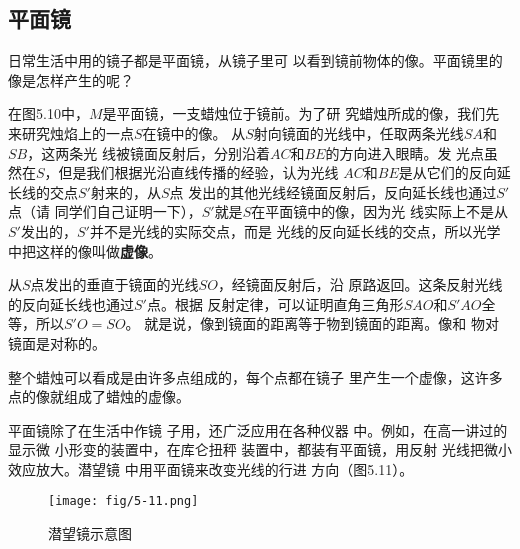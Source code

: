     \subsection{平面镜}

    日常生活中用的镜子都是平面镜，从镜子里可
    以看到镜前物体的像。平面镜里的像是怎样产生的呢？

    在图5.10中，$M$是平面镜，一支蜡烛位于镜前。为了研
    究蜡烛所成的像，我们先来研究烛焰上的一点$S$在镜中的像。
    从$S$射向镜面的光线中，任取两条光线$SA$和$SB$，这两条光
    线被镜面反射后，分别沿着$AC$和$BE$的方向进入眼睛。发
    光点虽然在$S$，但是我们根据光沿直线传播的经验，认为光线
    $AC$和$BE$是从它们的反向延长线的交点$S'$射来的，从$S$点
    发出的其他光线经镜面反射后，反向延长线也通过$S'$点（请
    同学们自己证明一下），$S'$就是$S$在平面镜中的像，因为光
    线实际上不是从$S'$发出的，$S'$并不是光线的实际交点，而是
    光线的反向延长线的交点，所以光学中把这样的像叫做\textbf{虚像}。

    从$S$点发出的垂直于镜面的光线$SO$，经镜面反射后，沿
    原路返回。这条反射光线的反向延长线也通过$S'$点。根据
    反射定律，可以证明直角三角形$SAO$和$S'AO$全等，所以$S'O=SO$。
    就是说，像到镜面的距离等于物到镜面的距离。像和
    物对镜面是对称的。

    整个蜡烛可以看成是由许多点组成的，每个点都在镜子
    里产生一个虚像，这许多点的像就组成了蜡烛的虚像。

    平面镜除了在生活中作镜
    子用，还广泛应用在各种仪器
    中。例如，在高一讲过的显示微
    小形变的装置中，在库仑扭秤
    装置中，都装有平面镜，用反射
    光线把微小效应放大。潜望镜
    中用平面镜来改变光线的行进
    方向（图5.11）。
    \begin{figure}[htp]\centering
        \texttt{[image: fig/5-11.png]}
        \caption{潜望镜示意图}
    \end{figure}

